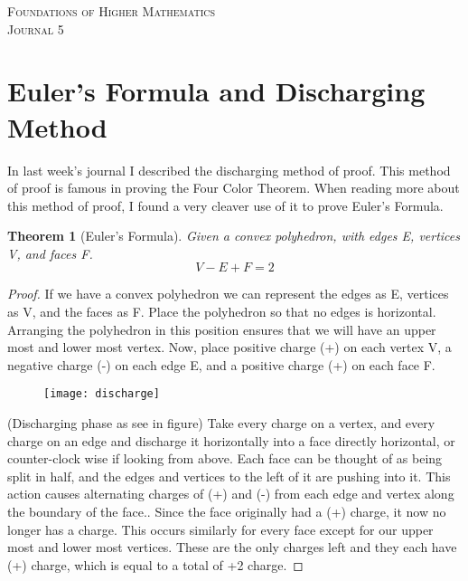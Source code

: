 \documentclass{article}
\newtheorem*{thm}{Theorem}
\begin{document}

\begin{center}
\textsc{\Large Foundations of Higher Mathematics}\\[.3cm]
\textsc{\Large Journal 5}\\[1cm]
\end{center}


\section*{Euler's Formula and Discharging Method}
In last week's journal I described the discharging method of proof. This method of proof is famous in proving the Four Color Theorem. When reading more about this method of proof, I found a very cleaver use of it to prove Euler's Formula.

\begin{thm}[Euler's Formula]
Given a convex polyhedron, with edges E, vertices V, and faces F.
$$
V - E + F = 2
$$
\end{thm}

\begin{multicols}{2}
\begin{proof}
If we have a convex polyhedron we can represent the edges as E, vertices as V, and the faces as F. Place the polyhedron so that no edges is horizontal. Arranging the polyhedron in this position ensures that we will have an upper most and lower most vertex. Now, place positive charge (+) on each vertex V, a negative charge (-) on each edge E, and a positive charge (+) on each face F. 
\begin{figure}[H]
\begin{center}
\texttt{[image: discharge]}
\end{center}
\end{figure}
(Discharging phase as see in figure) Take every charge on a vertex, and every charge on an edge and discharge it horizontally into a face directly horizontal, or counter-clock wise if looking from above. Each face can be thought of as being split in half, and the edges and vertices to the left of it are pushing into it. This action causes alternating charges of (+) and (-) from each edge and vertex along the boundary of the face.. Since the face originally had a (+) charge, it now no longer has a charge. This occurs similarly for every face except for our upper most and lower most vertices. These are the only charges left and they each have (+) charge, which is equal to a total of +2 charge.
\end{proof}

\end{multicols}
\end{document}
